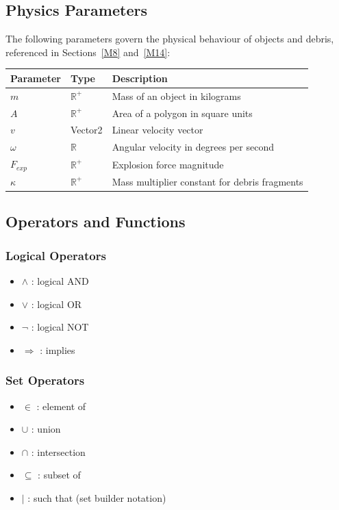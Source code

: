 \documentclass[12pt, titlepage]{article}
\begin{document}
\subsection{Physics Parameters}

The following parameters govern the physical behaviour of objects and debris, referenced in Sections~\ref{M8} and~\ref{M14}:

\begin{table}[h]
\centering
\begin{tabular}{lll}
\toprule
\textbf{Parameter} & \textbf{Type} & \textbf{Description} \\
\midrule
$m$ & $\mathbb{R}^+$ & Mass of an object in kilograms \\
$A$ & $\mathbb{R}^+$ & Area of a polygon in square units \\
$v$ & Vector2 & Linear velocity vector \\
$\omega$ & $\mathbb{R}$ & Angular velocity in degrees per second \\
$F_{exp}$ & $\mathbb{R}^+$ & Explosion force magnitude \\
$\kappa$ & $\mathbb{R}^+$ & Mass multiplier constant for debris fragments \\
\bottomrule
\end{tabular}
\end{table}

\subsection{Operators and Functions}

\subsubsection{Logical Operators}
\begin{itemize}
\item $\land$ : logical AND
\item $\lor$ : logical OR
\item $\neg$ : logical NOT
\item $\Rightarrow$ : implies
\end{itemize}

\subsubsection{Set Operators}
\begin{itemize}
\item $\in$ : element of
\item $\cup$ : union
\item $\cap$ : intersection
\item $\subseteq$ : subset of
\item $|$ : such that (set builder notation)
\end{itemize}
\end{document}
